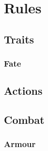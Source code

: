 \cleardoublepage

\section{Rules}

\physicalSkillChart

\mentalSkillChart

\begin{multicols}{2}

\subsection*{Traits}





\subsubsection*{Fate}


\subsubsection*{}




\subsection*{Actions}








\subsection*{Combat}





\commonWeaponsChart

\subsubsection*{Armour}


\end{multicols}
